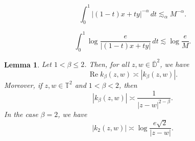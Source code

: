 \documentclass[10pt,a4paper]{amsart}
\newtheorem{lem}{Lemma}
\def\D{\mathbb D}
\begin{document}
\begin{equation}\label{eq:affine-power-estimate}
    \int_0^1|(1-t)x+t y|^{-\alpha}\,dt
    \lesssim_\alpha M^{-\alpha}.
\end{equation}

\begin{equation}\label{eq:affine-log-estimate}
    \int_0^1\log\frac{e}{|(1-t)x+ty|}\,dt
    \lesssim\log\frac{e}{M}.
\end{equation}

\begin{lem}\label{lem:kernel-estimates}
    Let $1<\beta\leq 2$. Then, for all $z,w\in \overline{\D}^2$, we have
    \begin{equation*}
        \operatorname{Re} k_\beta(z,w) \asymp |k_\beta(z,w)|.
    \end{equation*}
    Moreover, if $z,w\in \mathbb{T}^2$ and $1<\beta<2$, then
    \begin{equation*}
        |k_\beta(z,w)| \asymp \frac{1}{|z-w|^{2-\beta}}.
    \end{equation*}
    In the case $\beta=2$, we have
    \begin{equation*}
        |k_2(z,w)| \asymp \log \frac{e \sqrt{2}}{|z-w|}.
    \end{equation*}
\end{lem}
\end{document}

